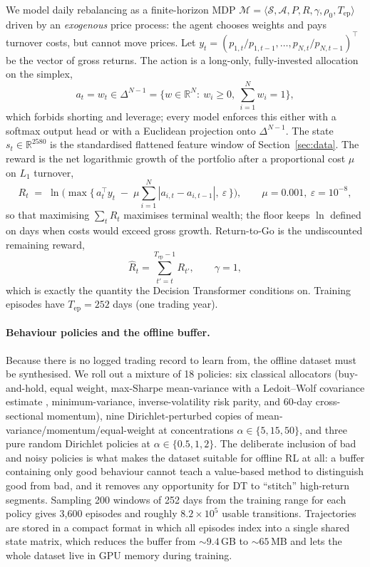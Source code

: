 \documentclass[11pt]{article}
\begin{document}
We model daily rebalancing as a finite-horizon MDP
$\mathcal{M} = \langle \mathcal{S}, \mathcal{A}, P, R, \gamma, \rho_0, T_{\text{ep}}\rangle$
driven by an \emph{exogenous} price process: the agent chooses weights and pays turnover costs,
but cannot move prices. Let $y_t = (p_{1,t}/p_{1,t-1}, \dots, p_{N,t}/p_{N,t-1})^\top$ be the
vector of gross returns. The action is a long-only, fully-invested allocation on the simplex,
\begin{equation}
  a_t = w_t \in \Delta^{N-1} = \Big\{ w \in \mathbb{R}^N :\ w_i \ge 0,\ \textstyle\sum_{i=1}^{N} w_i = 1 \Big\},
\end{equation}
which forbids shorting and leverage; every model enforces this either with a softmax output
head or with a Euclidean projection onto $\Delta^{N-1}$. The state $s_t \in \mathbb{R}^{2580}$
is the standardised flattened feature window of Section~\ref{sec:data}. The reward is the net
logarithmic growth of the portfolio after a proportional cost $\mu$ on $L_1$ turnover,
\begin{equation}
  R_t \;=\; \ln\Big( \max\big\{\, a_t^\top y_t \;-\; \mu \textstyle\sum_{i=1}^{N} |a_{i,t} - a_{i,t-1}| ,\ \varepsilon \,\big\} \Big),
  \qquad \mu = 0.001,\ \varepsilon = 10^{-8},
  \label{eq:reward}
\end{equation}
so that maximising $\sum_t R_t$ maximises terminal wealth; the floor keeps $\ln$ defined on days
when costs would exceed gross growth. Return-to-Go is the undiscounted remaining reward,
\begin{equation}
  \hat{R}_t = \sum_{t'=t}^{T_{\text{ep}}-1} R_{t'}, \qquad \gamma = 1,
\end{equation}
which is exactly the quantity the Decision Transformer conditions on. Training episodes have
$T_{\text{ep}} = 252$ days (one trading year).

\paragraph{Behaviour policies and the offline buffer.}
Because there is no logged trading record to learn from, the offline dataset must be synthesised.
We roll out a mixture of 18 policies: six classical allocators (buy-and-hold, equal weight,
max-Sharpe mean-variance with a Ledoit--Wolf covariance estimate \cite{ledoit2004wellconditioned},
minimum-variance, inverse-volatility risk parity, and 60-day cross-sectional momentum), nine
Dirichlet-perturbed copies of mean-variance/momentum/equal-weight at concentrations
$\alpha \in \{5, 15, 50\}$, and three pure random Dirichlet policies at
$\alpha \in \{0.5, 1, 2\}$. The deliberate inclusion of bad and noisy policies is what makes
the dataset suitable for offline RL at all: a buffer containing only good behaviour cannot
teach a value-based method to distinguish good from bad, and it removes any opportunity for
DT to ``stitch'' high-return segments. Sampling 200 windows of 252 days from the training
range for each policy gives 3{,}600 episodes and roughly $8.2 \times 10^{5}$ usable
transitions. Trajectories are stored in a compact format in which all episodes index into a
single shared state matrix, which reduces the buffer from ${\sim}9.4$\,GB to ${\sim}65$\,MB
and lets the whole dataset live in GPU memory during training.
\end{document}
